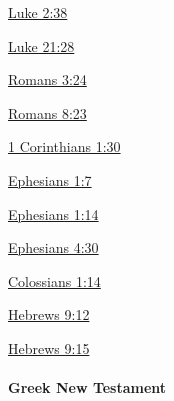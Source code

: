 				\begin{compactdesc}
					\item[{\hyperref[LUKE-2-38]{Luke 2:38}}]
					\item[{\hyperref[LUKE-21-28]{Luke 21:28}}]
					\item[{\hyperref[ROMANS-3-24]{Romans 3:24}}]
					\item[{\hyperref[ROMANS-8-23]{Romans 8:23}}]
					\item[{\hyperref[1CORINTHIANS-1-30]{1 Corinthians 1:30}}]
					\item[{\hyperref[EPHESIANS-1-7]{Ephesians 1:7}}]
					\item[{\hyperref[EPHESIANS-1-14]{Ephesians 1:14}}]
					\item[{\hyperref[EPHESIANS-4-30]{Ephesians 4:30}}]
					\item[{\hyperref[COLOSSIANS-1-14]{Colossians 1:14}}]
					\item[{\hyperref[HEBREWS-9-12]{Hebrews 9:12}}]
					\item[{\hyperref[HEBREWS-9-15]{Hebrews 9:15}}]
				\end{compactdesc}
			
		\paragraph{Greek New Testament} %
			\label{REDEMPTION-GREEK}
			
			\subparagraph{\texorpdfstring{}{}}
				\label{APOLUTROSIS}
			
				
